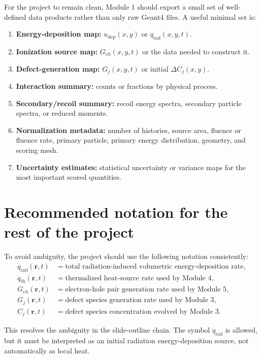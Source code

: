 \documentclass[11pt]{article}
\newcommand{\qrad}{\dot{q}_{\mathrm{rad}}}
\newcommand{\qth}{\dot{q}_{\mathrm{th}}}
\newcommand{\rpos}{\mathbf{r}}
\newcommand{\Geh}{G_{eh}}
\begin{document}
For the project to remain clean, Module 1 should export a small set of well-defined data products rather than only raw Geant4 files. A useful minimal set is:
\begin{enumerate}
\item \textbf{Energy-deposition map:} $u_{\mathrm{dep}}(x,y)$ or $\qrad(x,y,t)$.
\item \textbf{Ionization source map:} $G_{eh}(x,y,t)$ or the data needed to construct it.
\item \textbf{Defect-generation map:} $G_j(x,y,t)$ or initial $\Delta C_j(x,y)$.
\item \textbf{Interaction summary:} counts or fractions by physical process.
\item \textbf{Secondary/recoil summary:} recoil energy spectra, secondary particle spectra, or reduced moments.
\item \textbf{Normalization metadata:} number of histories, source area, fluence or fluence rate, primary particle, primary energy distribution, geometry, and scoring mesh.
\item \textbf{Uncertainty estimates:} statistical uncertainty or variance maps for the most important scored quantities.
\end{enumerate}

\section{Recommended notation for the rest of the project}

To avoid ambiguity, the project should use the following notation consistently:
\begin{align}
\qrad(\rpos,t) &= \text{total radiation-induced volumetric energy-deposition rate}, \\
\qth(\rpos,t) &= \text{thermalized heat-source rate used by Module 4}, \\
\Geh(\rpos,t) &= \text{electron-hole pair generation rate used by Module 5}, \\
G_j(\rpos,t) &= \text{defect species generation rate used by Module 3}, \\
C_j(\rpos,t) &= \text{defect species concentration evolved by Module 3}.
\end{align}

This resolves the ambiguity in the slide-outline chain. The symbol $\qrad$ is allowed, but it must be interpreted as an initial radiation energy-deposition source, not automatically as local heat.
\end{document}
